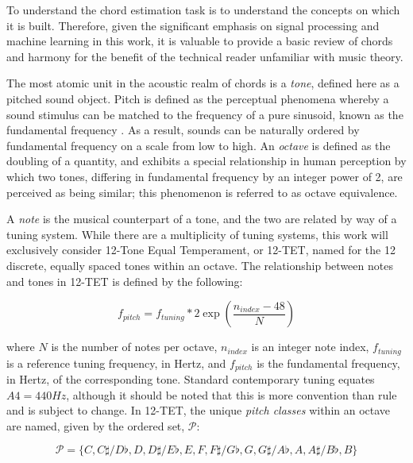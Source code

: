 To understand the chord estimation task is to understand the concepts on which it is built.
Therefore, given the significant emphasis on signal processing and machine learning in this work, it is valuable to provide a basic review of chords and harmony for the benefit of the technical reader unfamiliar with music theory.

The most atomic unit in the acoustic realm of chords is a \emph{tone}, defined here as a pitched sound object.
Pitch is defined as the perceptual phenomena whereby a sound stimulus can be matched to the frequency of a pure sinusoid, known as the fundamental frequency \cite{Krumhansl1979Psychological}.
As a result, sounds can be naturally ordered by fundamental frequency on a scale from low to high.
An \emph{octave} is defined as the doubling of a quantity, and exhibits a special relationship in human perception by which two tones, differing in fundamental frequency by an integer power of 2, are perceived as being similar;
this phenomenon is referred to as octave equivalence.

A \emph{note} is the musical counterpart of a tone, and the two are related by way of a tuning system.
While there are a multiplicity of tuning systems, this work will exclusively consider 12-Tone Equal Temperament, or 12-TET, named for the 12 discrete, equally spaced tones within an octave.
The relationship between notes and tones in 12-TET is defined by the following:

\begin{equation}
\label{eq:tuning}
f_{pitch} = f_{tuning} * 2 \exp(\frac{n_{index} - 48}{N})
\end{equation}

\noindent where $N$ is the number of notes per octave, $n_{index}$ is an integer note index, $f_{tuning}$ is a reference tuning frequency, in Hertz, and $f_{pitch}$ is the fundamental frequency, in Hertz, of the corresponding tone.
Standard contemporary tuning equates $A4=440Hz$, although it should be noted that this is more convention than rule and is subject to change.
In 12-TET, the unique \emph{pitch classes} within an octave are named, given by the ordered set, $\mathcal{P}$:

\begin{equation}
\label{eq:pitch_classes}
\mathcal{P} = \{C, C\sharp / D\flat, D, D\sharp / E\flat, E, F, F\sharp / G\flat, G, G\sharp / A\flat, A, A\sharp / B\flat, B\}
\end{equation}

